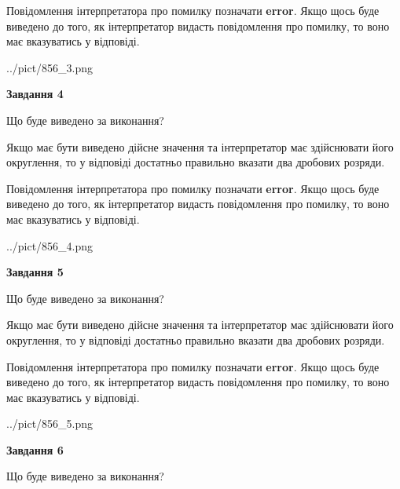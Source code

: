 \documentclass[12pt, ukrainian]{article}
\begin{document}
{\begin {Large}
Повідомлення інтерпретатора про помилку позначати \textbf{error}.
Якщо щось буде виведено до того, як інтерпретатор видасть повідомлення про помилку, 
то воно має вказуватись у відповіді. \par

\begin{center}
	{../pict/856_3.png}
\end{center}
\newpage

{\begin {center}\textbf{Завдання 4}\end {center}}\par
Що буде виведено за виконання? \par

Якщо має бути виведено дійсне значення та інтерпретатор має здійснювати його округлення, 
то у відповіді достатньо правильно вказати два дробових розряди.

Повідомлення інтерпретатора про помилку позначати \textbf{error}.
Якщо щось буде виведено до того, як інтерпретатор видасть повідомлення про помилку, 
то воно має вказуватись у відповіді. \par

\begin{center}
	{../pict/856_4.png}
\end{center}
\newpage

{\begin {center}\textbf{Завдання 5}\end {center}}\par
Що буде виведено за виконання? \par

Якщо має бути виведено дійсне значення та інтерпретатор має здійснювати його округлення, 
то у відповіді достатньо правильно вказати два дробових розряди.

Повідомлення інтерпретатора про помилку позначати \textbf{error}.
Якщо щось буде виведено до того, як інтерпретатор видасть повідомлення про помилку, 
то воно має вказуватись у відповіді. \par

\begin{center}
	{../pict/856_5.png}
\end{center}
\newpage

{\begin {center}\textbf{Завдання 6}\end {center}}\par
Що буде виведено за виконання? \par


\end{Large}}
\end{document}
